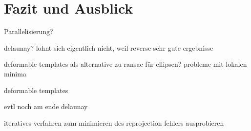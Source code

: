 \chapter{Fazit und Ausblick}
Parallelisierung?

delaunay? lohnt sich eigentlich nicht, weil reverse sehr gute ergebnisse

deformable templates als alternative zu ransac für ellipsen?  probleme mit lokalen minima



deformable templates

evtl noch am ende delaunay

iteratives verfahren zum minimieren des reprojection fehlers ausprobieren